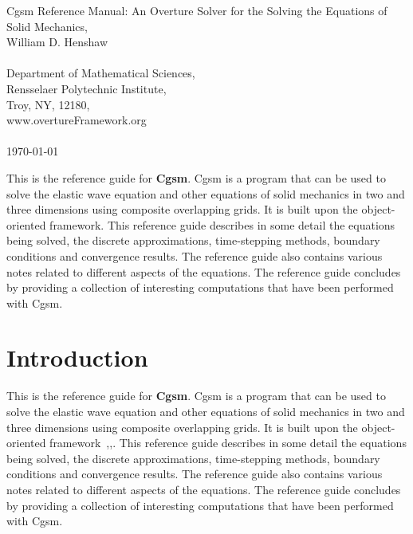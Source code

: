 \documentclass[11pt]{article}
\begin{document}
\vspace{5\baselineskip}
\begin{flushleft}
{\Large
Cgsm Reference Manual: An Overture Solver for the Solving the Equations of Solid Mechanics, \\
}
\vspace{2\baselineskip}
William D. Henshaw \\
\  \\
Department of Mathematical Sciences, \\
Rensselaer Polytechnic Institute, \\
Troy, NY, 12180,\\
www.overtureFramework.org \\
~~ \\
\today\\

\vspace{4\baselineskip}


This is the reference guide for {\bf Cgsm}. Cgsm is a program that can be
used to solve the elastic wave equation and other equations of solid mechanics in two and 
three dimensions using composite overlapping grids. It is built upon the
\Overture object-oriented framework.  
This reference guide describes in some detail the equations being solved,
the discrete approximations, time-stepping methods, boundary conditions and convergence results. 
The reference guide also contains various notes related to different aspects of the equations. 
The reference guide concludes by providing a collection of interesting computations that
have been performed with Cgsm. 


\end{flushleft}

\clearpage
\tableofcontents

\vfill\eject


\section{Introduction}

This is the reference guide for {\bf Cgsm}. Cgsm is a program that can be
used to solve the elastic wave equation and other equations of solid mechanics
in two and three dimensions using composite overlapping grids. It is built upon the
\Overture object-oriented framework~\cite{Brown97},\cite{Henshaw96a},\cite{iscope97}. 
This reference guide describes in some detail the equations being solved,
the discrete approximations, time-stepping methods, boundary conditions and convergence results. 
The reference guide also contains various notes related to different aspects of the equations. 
The reference guide concludes by providing a collection of interesting computations that
have been performed with Cgsm.
\end{document}
